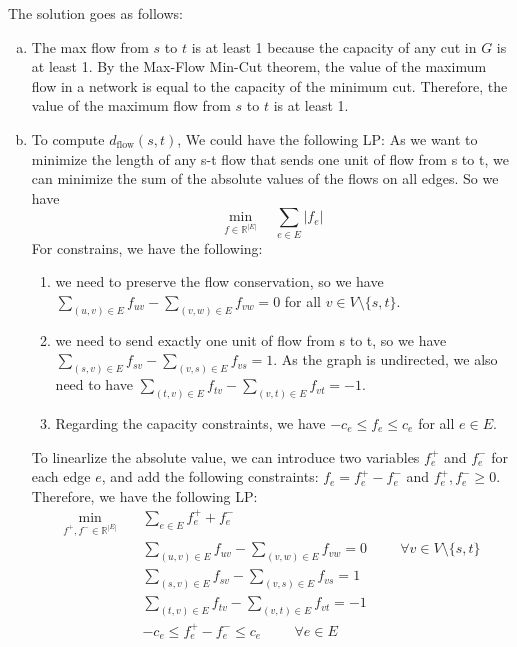 \documentclass[10pt]{article}
\begin{document}
\begin{solution}
The solution goes as follows:
    \begin{enumerate}[(a)]
        \item The max flow from $s$ to $t$ is at least 1 because the capacity of any cut in $G$ is at least 1. By the Max-Flow Min-Cut theorem, the value of the maximum flow in a network is equal to the capacity of the minimum cut. Therefore, the value of the maximum flow from $s$ to $t$ is at least 1.
        \item To compute $d_{\text{flow}} (s,t)$, We could have the following LP: As we want to minimize the length of any s-t flow that sends one unit of flow from s to t, we can minimize the sum of the absolute values of the flows on all edges. So we have 
        \[
            \min_{f \in \mathbb{R}^{|E|}} \quad \sum_{e \in E} |f_e| 
        \]
        For constrains, we have the following:
        \begin{enumerate}[(1)]
            \item we need to preserve the flow conservation, so we have $\sum_{(u,v) \in E} f_{uv} - \sum_{(v,w) \in E} f_{vw} = 0$ for all $v \in V \setminus \{s,t\}$.
            \item we need to send exactly one unit of flow from s to t, so we have $\sum_{(s,v) \in E} f_{sv} - \sum_{(v,s) \in E} f_{vs} = 1$. As the graph is undirected, we also need to have $\sum_{(t,v) \in E} f_{tv} - \sum_{(v,t) \in E} f_{vt} = -1$.
            \item Regarding the capacity constraints, we have $-c_e \leq f_e \leq c_e$ for all $e \in E$.
        \end{enumerate}
        To linearlize the absolute value, we can introduce two variables $f_e^+$ and $f_e^-$ for each edge $e$, and add the following constraints: $f_e = f_e^+ - f_e^-$ and $f_e^+, f_e^- \geq 0$. Therefore, we have the following LP:
        \begin{align*}
            \min_{f^+, f^- \in \mathbb{R}^{|E|}} \quad & \sum_{e \in E} f_e^+ + f_e^-\\
            & \sum_{(u,v) \in E} f_{uv} - \sum_{(v,w) \in E} f_{vw} = 0 \hspace{1cm} \forall v \in V \setminus \{s,t\}\\
            & \sum_{(s,v) \in E} f_{sv} - \sum_{(v,s) \in E} f_{vs} = 1\\
            & \sum_{(t,v) \in E} f_{tv} - \sum_{(v,t) \in E} f_{vt} = -1\\
            & -c_e \leq f_e^+ - f_e^- \leq c_e \hspace{1cm} \forall e \in E\\

\end{align*}
\end{enumerate}
\end{solution}
\end{document}
